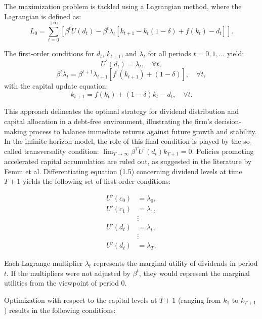 \documentclass[12pt]{article}
\begin{document}
The maximization problem is tackled using a Lagrangian method, where the Lagrangian is defined as:
\[L_0 = \sum_{t=0}^{+\infty}\left[{\beta^t U(d_t) - \beta^t \lambda_t\left[k_{t+1} - k_{t}(1 - \delta) + f(k_t) - d_t\right]}\right].\]

The first-order conditions for \(d_{t}\), \(k_{t+1}\), and \(\lambda_t\) for all periods \(t=0,1,\ldots\) yield:
\[
U^{\prime}(d_{t}) = \lambda_t, \quad \forall t,
\]
\[
\beta^t \lambda_t = \beta^{t+1} \lambda_{t+1}[f^{\prime}(k_{t+1}) + (1-\delta)], \quad \forall t,
\]
with the capital update equation:
\[
k_{t+1} = f(k_t) + (1-\delta) k_t - d_{t}, \quad \forall t.
\]

This approach delineates the optimal strategy for dividend distribution and capital allocation in a debt-free
environment, illustrating the firm's decision-making process to balance  immediate returns against future growth and
stability.
In the infinite horizon model, the role of this final
condition is played by the so-called transversality condition:
$\lim _{T \rightarrow \infty} \beta^T U^{\prime}\left(d_{t}\right) k_{T+1}=0$.
Policies promoting accelerated capital accumulation are ruled out, as suggested in the literature by Femm et al.
Differentiating  equation (1.5) concerning dividend levels at time \(T+1\) yields the following set of first-order
conditions:

\begin{equation}
    \begin{aligned}
    U'(c_0) &= \lambda_0, \\
    U'(c_1) &= \lambda_1, \\
    & \vdots \\
    U'(d_{t}) &= \lambda_t, \\
    & \vdots \\
    U'(d_{t}) &= \lambda_T.
    \end{aligned}
\end{equation}

Each Lagrange multiplier \(\lambda_t\) represents the marginal utility of dividends in period \(t\). If the
multipliers were not  adjusted by \(\beta^t\), they would represent the marginal utilities from the viewpoint of period
0.

Optimization with respect to the capital levels at \(T+1\) (ranging from \(k_1\) to \(k_{T+1}\)) results in the following conditions:
\end{document}
